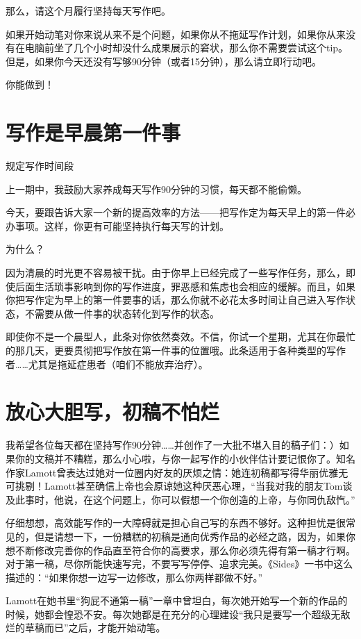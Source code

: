 \documentclass{ctexart}
\begin{document}
那么，请这个月履行坚持每天写作吧。

如果开始动笔对你来说从来不是个问题，如果你从不拖延写作计划，如果你从来没有在电脑前坐了几个小时却没什么成果展示的窘状，那么你不需要尝试这个tip。但是，如果你今天还没有写够90分钟（或者15分钟），那么请立即行动吧。

你能做到！

\section{写作是早晨第一件事}

规定写作时间段

上一期中，我鼓励大家养成每天写作90分钟的习惯，每天都不能偷懒。

今天，要跟告诉大家一个新的提高效率的方法——把写作定为每天早上的第一件必办事项。这样，你更有可能坚持执行每天写的计划。

为什么？

因为清晨的时光更不容易被干扰。由于你早上已经完成了一些写作任务，那么，即使后面生活琐事影响到你的写作进度，罪恶感和焦虑也会相应的缓解。而且，如果你把写作定为早上的第一件要事的话，那么你就不必花太多时间让自己进入写作状态，不需要从做一件事的状态转化到写作的状态。

即使你不是一个晨型人，此条对你依然奏效。不信，你试一个星期，尤其在你最忙的那几天，更要贯彻把写作放在第一件事的位置哦。此条适用于各种类型的写作者……尤其是拖延症患者（咱们不能放弃治疗）。

\section{放心大胆写，初稿不怕烂}

我希望各位每天都在坚持写作90分钟……并创作了一大批不堪入目的稿子们：）如果你的文稿并不糟糕，那么小心啦，与你一起写作的小伙伴估计要记恨你了。知名作家Lamott曾表达过她对一位圈内好友的厌烦之情：她连初稿都写得华丽优雅无可挑剔！Lamott甚至确信上帝也会原谅她这种厌恶心理，“当我对我的朋友Tom谈及此事时，他说，在这个问题上，你可以假想一个你创造的上帝，与你同仇敌忾。”

仔细想想，高效能写作的一大障碍就是担心自己写的东西不够好。这种担忧是很常见的，但是请想一下，一份糟糕的初稿是通向优秀作品的必经之路，因为，如果你想不断修改完善你的作品直至符合你的高要求，那么你必须先得有第一稿才行啊。对于第一稿，尽你所能快速写完，不要写写停停、追求完美。《Sides》一书中这么描述的：“如果你想一边写一边修改，那么你两样都做不好。”

Lamott在她书里“狗屁不通第一稿”一章中曾坦白，每次她开始写一个新的作品的时候，她都会惶恐不安。每次她都是在充分的心理建设“我只是要写一个超级无敌烂的草稿而已”之后，才能开始动笔。
\end{document}
